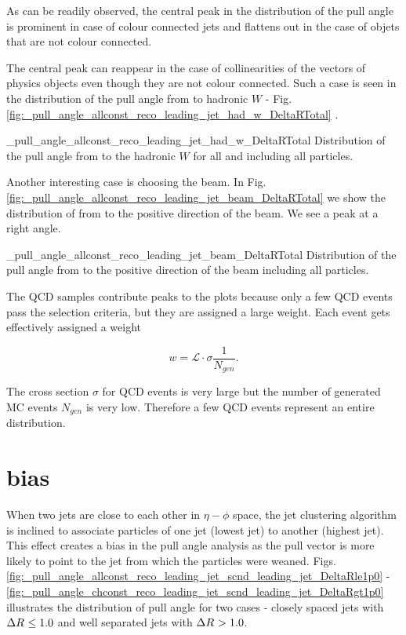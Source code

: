 As can be readily observed, the central peak in the distribution of the pull angle is prominent in case of colour connected jets and flattens out in the case of objets that are not colour connected.

The central peak can reappear in the case of collinearities of the vectors of physics objects even though they are not colour connected. Such a case is seen in the distribution of the pull angle from \leadingjet to hadronic $W$ - Fig. \ref{fig:_pull_angle_allconst_reco_leading_jet_had_w_DeltaRTotal}
. 

          {_pull_angle_allconst_reco_leading_jet_had_w_DeltaRTotal}
          {Distribution of the pull angle from \leadingjet to the hadronic $W$ for all \DeltaR and including all particles.}

Another interesting case is choosing the beam. In Fig. \ref{fig:_pull_angle_allconst_reco_leading_jet_beam_DeltaRTotal} we show the distribution of \pullangle from \leadingjet to the positive direction of the beam. We see a peak at a right angle.

          {_pull_angle_allconst_reco_leading_jet_beam_DeltaRTotal}
          {Distribution of the pull angle from \leadingjet to the positive direction of the beam including all particles.}

The QCD samples contribute peaks to the plots because only a few QCD events pass the selection criteria, but they are assigned a large weight. Each event gets effectively assigned a weight

\begin{equation}
w=\mathcal{L}\cdot\sigma\frac{1}{N_{gen}}.
\end{equation}

The cross section $\sigma$ for QCD events is very large but the number of generated MC events $N_{gen}$ is very low. Therefore a few QCD events represent an entire distribution.

\section{\DeltaR bias}

When two jets are close to each other in $\eta-\phi$ space, the jet clustering algorithm is inclined to associate particles of one jet (lowest \pt jet) to another (highest \pt jet). This effect creates a bias in the pull angle analysis as the pull vector is more likely to point to the jet from which the particles were weaned. Figs. \ref{fig:_pull_angle_allconst_reco_leading_jet_scnd_leading_jet_DeltaRle1p0} - \ref{fig:_pull_angle_chconst_reco_leading_jet_scnd_leading_jet_DeltaRgt1p0} illustrates the distribution of pull angle for two cases - closely spaced jets with $\Delta R^{}\leq1.0$ and well separated jets with $\Delta R^{}>1.0$.


